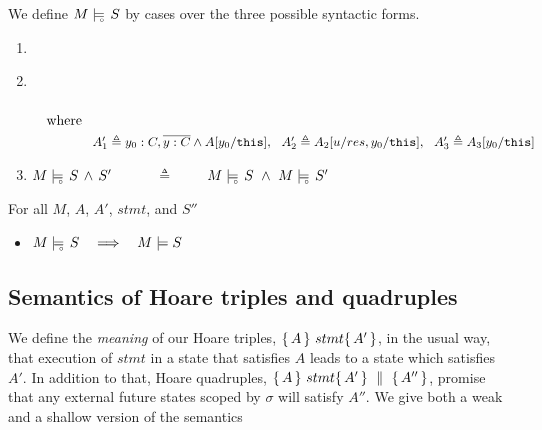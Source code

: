 \begin{definition} 

We define $M \models\!\!\!\!_{_{\circ}}\  {S} $ by cases over the three possible syntactic forms.

\label{def:necessity-semantics:strong}

\begin{enumerate}
\item
\sdN{ 
$\satisfiesD{M}{\TwoStatesN {\overline {x:C}} {A}} \ \  \ \triangleq   \ \ \ 
\forall \sigma.[\  \satisfiesD {M} {\quadruple {\externalexec \wedge A} {\sigma} {A} {A} } \ ] $
}
  \item
 \\ 
  \\
$\strut  \ \ \  \mbox{where}$\\
$\strut  \ \ \   \ \ \ \ \ \ \ \ \   \  \ A_1' \triangleq   y_0:C,{\overline {y:C}}   \wedge   A[y_0/\mbox{\normalfont{\texttt{this}}}],\  \  A_2' \triangleq A_2[u/res,y_0/\mbox{\normalfont{\texttt{this}}}],\ \ A_3' \triangleq A_3[y_0/\mbox{\normalfont{\texttt{this}}}] $
 \item
 $M \models\!\!\!\!_{_{\circ}}\  S\, \wedge\, S' $\ \ \  \ \ \  $\triangleq$  \  \ \  \   $\satisfiesD{M}{S}\ \wedge \ \satisfiesD{M}{S'}$
\end{enumerate}
\end{definition}


\begin{lemma}
For all $M$, $A$, $A'$, $stmt$, and $S''$
\begin{itemize}
\item
$\satisfiesD {M} {S}  \ \ \ \Longrightarrow \ \ \ \satisfies {M} {S}$
\end{itemize}
\end{lemma}



\subsection{Semantics of Hoare triples and quadruples}
\label{sect:HLmeans}

We  define the {\emph {meaning}} of  our Hoare triples, $ \{\, A \, \}\ stmt \{\, A' \, \}$,  in the usual way, \ie that execution of $stmt$ in a state that satisfies $A$ leads to a state which satisfies $A'$.  
In addition to that, Hoare quadruples, $ \{\, A \, \}\ stmt \{\, A' \, \} \, \,\parallel\,\, \{\, A'' \, \} $, promise that any external future states scoped by $\sigma$ will satisfy $A''$.
We give both a weak and a shallow version of the semantics

